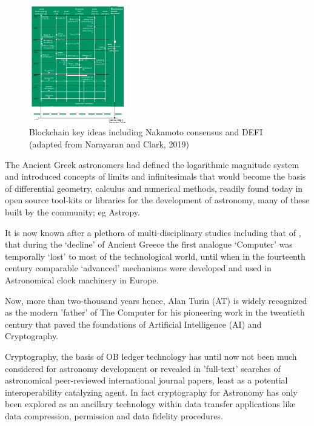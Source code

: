 \documentclass[final,5p,times,twocolumn,authoryear]{elsarticle}
\begin{document}
 \begin{figure}
    \centering
    \includegraphics[width=0.38\textwidth]{narayanan3.png}
    \vspace*{-0.3cm}
    \caption{Blockchain key ideas including Nakamoto consensus and DEFI (adapted from Narayaran and Clark, 2019)}
    \label{fig:narayanan}
\end{figure}
 
 The Ancient Greek astronomers had defined the logarithmic magnitude system and introduced concepts of limits and infinitesimals that would become the basis of differential geometry, calculus and numerical methods, readily found today in open source tool-kits or  libraries for the development of astronomy, many of these built by the community; eg Astropy.
 
 It is now known after a plethora of multi-disciplinary studies including that of \citet{Freeth2021}, that during the `decline' of Ancient Greece the first analogue `Computer' was temporally `lost' to most of the technological world, until when in the fourteenth century comparable `advanced' mechanisms were developed and used in Astronomical clock machinery in Europe. 
 
 Now, more than two-thousand years hence, Alan Turin (AT) is widely recognized as the modern 'father' of The Computer for his pioneering  work in the twentieth century that paved the foundations of Artificial Intelligence (AI) and Cryptography. 
 
Cryptography, the basis of OB ledger technology has until now not been much considered for astronomy development or revealed in 'full-text' searches of astronomical peer-reviewed international journal papers, least as a potential interoperability catalyzing agent. In fact cryptography for Astronomy has only been explored as an ancillary technology within data transfer applications like data compression, permission and data fidelity procedures.
\end{document}
